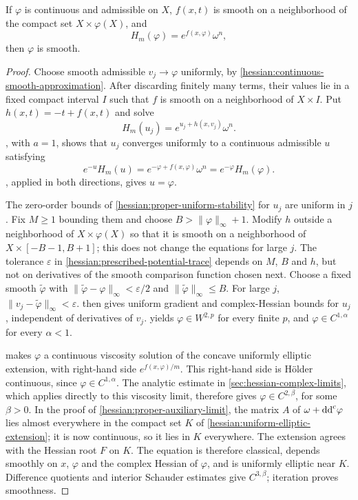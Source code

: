 \begin{theorem}\label{hessian:continuous-hessian-regularity}
If $\varphi$ is continuous and admissible on $X$, $f(x,t)$ is smooth
on a neighborhood of the compact set $X\times\varphi(X)$, and
\[
 H_m(\varphi)=e^{f(x,\varphi)}\omega^n,
\]
then $\varphi$ is smooth.
\end{theorem}
\begin{proof}
Choose smooth admissible $v_j\to\varphi$ uniformly, by \cref{hessian:continuous-smooth-approximation}. After discarding finitely many terms, their values lie in a fixed compact interval $I$ such that $f$ is
smooth on a neighborhood of $X\times I$. Put $h(x,t)=-t+f(x,t)$ and solve
\[
 H_m(u_j)=e^{u_j+h(x,v_j)}\omega^n.
\]
, with $a=1$, shows that $u_j$ converges uniformly
to a continuous admissible $u$ satisfying
\[
 e^{-u}H_m(u)=e^{-\varphi+f(x,\varphi)}\omega^n
                              =e^{-\varphi}H_m(\varphi).
\]
, applied in both directions, gives $u=\varphi$.

The zero-order bounds of \cref{hessian:proper-uniform-stability} for $u_j$ are uniform in $j$. Fix $M\geq1$ bounding them
and choose $B>\|\varphi\|_\infty+1$. Modify $h$ outside a neighborhood of $X\times\varphi(X)$ so that it is smooth on a neighborhood of $X\times[-B-1,B+1]$; this does not change the equations for large $j$. The tolerance $\varepsilon$ in
\cref{hessian:prescribed-potential-trace} depends on $M$, $B$ and
$h$, but not on derivatives of the smooth comparison function chosen next.
Choose a fixed smooth $\widetilde\varphi$ with
$\|\widetilde\varphi-\varphi\|_\infty<\varepsilon/2$ and
$\|\widetilde\varphi\|_\infty\leq B$.
For large $j$, $\|v_j-\widetilde\varphi\|_\infty<\varepsilon$.
 then gives uniform gradient
and complex-Hessian bounds for $u_j$, independent of derivatives of
$v_j$.  yields
$\varphi\in W^{2,p}$ for every finite $p$, and
$\varphi\in C^{1,\alpha}$ for every $\alpha<1$.

 makes $\varphi$ a continuous viscosity
solution of the concave uniformly elliptic extension, with right-hand
side $e^{f(x,\varphi)/m}$. This right-hand side is H\"older continuous, since $\varphi\in C^{1,\alpha}$. The analytic estimate in \cref{sec:hessian-complex-limits}, which applies directly to this viscosity limit, therefore gives
$\varphi\in C^{2,\beta}$, for some $\beta>0$.
In the proof of \cref{hessian:proper-auxiliary-limit}, the matrix $A$
of $\omega+\mathrm{dd}^{\mathrm{c}}\varphi$ lies almost everywhere in the compact set $K$
of \cref{hessian:uniform-elliptic-extension}; it is now continuous, so
it lies in $K$ everywhere. The extension agrees with the Hessian root
$F$ on $K$. The equation is therefore classical, depends smoothly on
$x$, $\varphi$ and the complex Hessian of $\varphi$, and is uniformly
elliptic near $K$.
Difference quotients and interior Schauder estimates give $C^{3,\beta}$;
iteration proves smoothness.
\end{proof}

